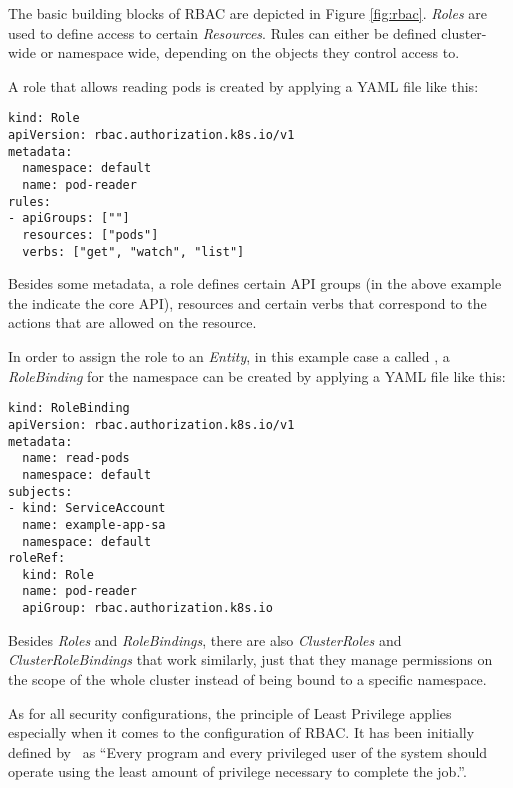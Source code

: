 
The basic building blocks of RBAC are depicted in Figure \ref{fig:rbac}. \textit{Roles} are used to define access to certain \textit{Resources}. Rules can either be defined cluster-wide or namespace wide, depending on the objects they control access to.

A role that allows reading pods is created by applying a YAML file like this: 

\begin{lstlisting}[frame=single]
kind: Role
apiVersion: rbac.authorization.k8s.io/v1
metadata:
  namespace: default
  name: pod-reader
rules:
- apiGroups: [""]
  resources: ["pods"]
  verbs: ["get", "watch", "list"]
\end{lstlisting}

Besides some metadata, a role defines certain API groups (in the above example the  indicate the core API), resources and certain verbs that correspond to the actions that are allowed on the resource. 

In order to assign the role to an \textit{Entity}, in this example case a  called , a \textit{RoleBinding} for the namespace  can be created by applying a YAML file like this:

\begin{lstlisting}[frame=single]
kind: RoleBinding
apiVersion: rbac.authorization.k8s.io/v1
metadata:
  name: read-pods
  namespace: default
subjects:
- kind: ServiceAccount
  name: example-app-sa 
  namespace: default
roleRef:
  kind: Role
  name: pod-reader
  apiGroup: rbac.authorization.k8s.io
\end{lstlisting}

Besides \textit{Roles} and \textit{RoleBindings}, there are also \textit{ClusterRoles} and \textit{ClusterRoleBindings} that work similarly, just that they manage permissions on the scope of the whole cluster instead of being bound to a specific namespace.

As for all security configurations, the principle of Least Privilege applies especially when it comes to the configuration of RBAC. It has been initially defined by~\textcite{leastPrivilege} as \enquote{Every program and every privileged user of the system should operate using the least amount of privilege necessary to complete the job.}. 

